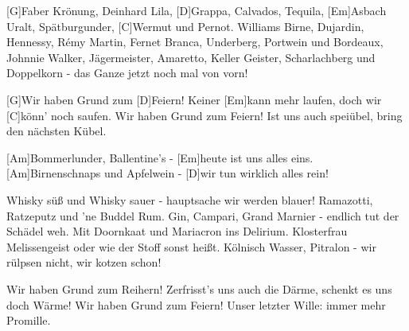 

\begin{guitar}
	[G]Faber Krönung, Deinhard Lila, [D]Grappa, Calvados, Tequila,
	[Em]Asbach Uralt, Spätburgunder, [C]Wermut und Pernot.
	Williams Birne, Dujardin, Hennessy, Rémy Martin,
	Fernet Branca, Underberg, Portwein und Bordeaux,
	Johnnie Walker, Jägermeister, Amaretto, Keller Geister,
	Scharlachberg und Doppelkorn - das Ganze jetzt noch mal von vorn!
	
	\begin{highlightbar}
		[G]Wir haben Grund zum [D]Feiern!
		Keiner [Em]kann mehr laufen, doch wir [C]könn' noch saufen.
		Wir haben Grund zum Feiern!
		Ist uns auch speiübel, bring den nächsten Kübel.
	\end{highlightbar}
	
	\songsection{Bridge}
	[Am]Bommerlunder, Ballentine's - [Em]heute ist uns alles eins.
	[Am]Birnenschnaps und Apfelwein - [D]wir tun wirklich alles rein!
	
	\songsection{Strophe 2}
	Whisky süß und Whisky sauer - hauptsache wir werden blauer!
	Ramazotti, Ratzeputz und 'ne Buddel Rum.
	Gin, Campari, Grand Marnier - endlich tut der Schädel weh.
	Mit Doornkaat und Mariacron ins Delirium.
	Klosterfrau Melissengeist oder wie der Stoff sonst heißt.
	Kölnisch Wasser, Pitralon - wir rülpsen nicht, wir kotzen schon!
	
	\begin{highlightbar}
		\songsection{Refrain}
		Wir haben Grund zum Reihern!
		Zerfrisst's uns auch die Därme, schenkt es uns doch Wärme!
		Wir haben Grund zum Feiern!
		Unser letzter Wille: immer mehr Promille.
	\end{highlightbar}
\end{guitar}
